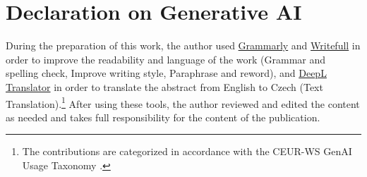 \chapter*{Declaration on Generative AI}

During the preparation of this work, the author used
\href{https://grammarly.com/}{Grammarly} and \href{https://www.writefull.com/}{Writefull} in order to improve the readability and language of the work (Grammar and spelling check, Improve writing style, Paraphrase and reword), and
\href{https://www.deepl.com/}{DeepL Translator} in order to translate the abstract from English to Czech (Text Translation).\footnote{The contributions are categorized in accordance with the CEUR-WS GenAI Usage Taxonomy \cite{GenAITaxonomy}.}
After using these tools, the author reviewed and edited the content as needed and takes full responsibility for the content of the publication.
